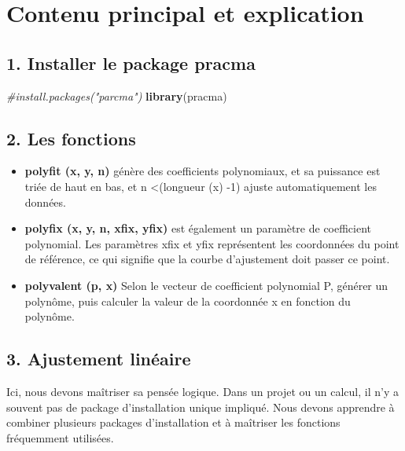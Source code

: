 \documentclass[
]{article}
\newenvironment{Shaded}{\begin{snugshade}}{\end{snugshade}}
\newcommand{\CommentTok}[1]{\textcolor[rgb]{0.56,0.35,0.01}{\textit{#1}}}
\newcommand{\KeywordTok}[1]{\textcolor[rgb]{0.13,0.29,0.53}{\textbf{#1}}}
\newcommand{\NormalTok}[1]{#1}
\begin{document}
\hypertarget{contenu-principal-et-explication}{%
\section{Contenu principal et
explication}\label{contenu-principal-et-explication}}

\hypertarget{installer-le-package-pracma}{%
\subsection{1. Installer le package
pracma}\label{installer-le-package-pracma}}

\begin{Shaded}
\begin{Highlighting}[]
\CommentTok{#install.packages("parcma")}
\KeywordTok{library}\NormalTok{(pracma)}
\end{Highlighting}
\end{Shaded}

\hypertarget{les-fonctions}{%
\subsection{2. Les fonctions}\label{les-fonctions}}

\begin{itemize}
\item
  \textbf{polyfit (x, y, n)} génère des coefficients polynomiaux, et sa
  puissance est triée de haut en bas, et n \textless(longueur (x) -1)
  ajuste automatiquement les données.
\item
  \textbf{polyfix (x, y, n, xfix, yfix)} est également un paramètre de
  coefficient polynomial. Les paramètres xfix et yfix représentent les
  coordonnées du point de référence, ce qui signifie que la courbe
  d'ajustement doit passer ce point.
\item
  \textbf{polyvalent (p, x)} Selon le vecteur de coefficient polynomial
  P, générer un polynôme, puis calculer la valeur de la coordonnée x en
  fonction du polynôme.
\end{itemize}

\hypertarget{ajustement-linuxe9aire}{%
\subsection{3. Ajustement linéaire}\label{ajustement-linuxe9aire}}

Ici, nous devons maîtriser sa pensée logique. Dans un projet ou un
calcul, il n'y a souvent pas de package d'installation unique impliqué.
Nous devons apprendre à combiner plusieurs packages d'installation et à
maîtriser les fonctions fréquemment utilisées.
\end{document}
